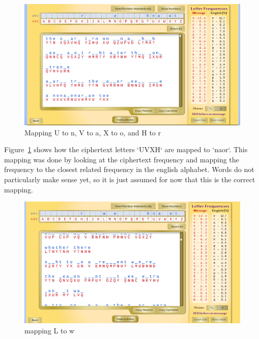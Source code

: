 \documentclass[12pt]{article}
\begin{document}
\begin{figure}[H]
    \begin{center}
        \includegraphics[scale=0.48]{c6.png}
    \end{center}{}
    \caption{Mapping U to n, V to a, X to o, and H to r}
    \label{fig:c6}
\end{figure}

Figure~\ref{fig:c6} shows how the ciphertext letters `UVXH` are mapped to `naor`. This mapping was done by looking at the ciphertext frequency and mapping the frequency to the closest related frequency in the english alphabet. Words do not particularly make sense yet, so it is just assumed for now that this is the correct mapping.



\begin{figure}[H]
    \begin{center}
        \includegraphics[scale=0.48]{c7.png}
    \end{center}{}
    \caption{mapping L to w}
    \label{fig:c7}
\end{figure}
\end{document}
